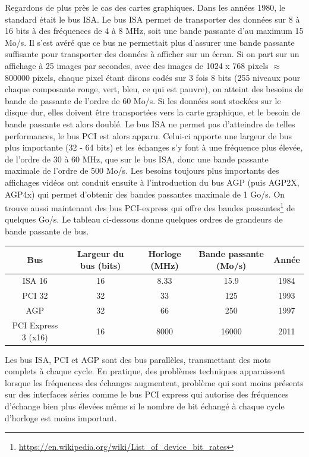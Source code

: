 Regardons de plus près le cas des cartes graphiques. Dans les années 1980, le standard était le bus ISA. Le bus ISA permet de transporter des données sur 8 à 16 bits à des fréquences de 4 à 8 MHz, soit une bande passante d'au maximum 15 Mo/s. Il s'est avéré que ce bus ne permettait plus d'assurer une bande passante suffisante pour transporter des données à afficher sur un écran. Si on part sur un affichage à 25 images par secondes, avec des images de 1024 x 768 pixels $\approx$ 800000 pixels, chaque pixel étant disons codés sur 3 fois 8 bits (255 niveaux pour chaque composante rouge, vert, bleu, ce qui est pauvre), on atteint des besoins de bande de passante de l'ordre de 60 Mo/s. Si les données sont stockées sur le disque dur, elles doivent être transportées vers la carte graphique, et le besoin de bande passante est alors doublé. Le bus ISA ne permet pas d'atteindre de telles performances, le bus PCI est alors apparu. Celui-ci apporte une largeur de bus plus importante (32 - 64 bits) et les échanges s'y font à une fréquence plus élevée, de l'ordre de 30 à 60 MHz, que sur le bus ISA, donc une bande passante maximale de l'ordre de 500 Mo/s. Les besoins toujours plus importants des affichages vidéos ont conduit ensuite à l'introduction du bus AGP (puis AGP2X, AGP4x) qui permet d'obtenir des bandes passantes maximale de 1 Go/s. On trouve aussi maintenant des bus PCI-express qui offre des bandes passantes\footnote{\url{https://en.wikipedia.org/wiki/List_of_device_bit_rates}} de quelques Go/s. Le tableau ci-dessous donne quelques ordres de grandeurs de bande passante de bus.

\begin{tabular}{ccccc}
Bus & Largeur du bus (bits)  & Horloge (MHz) & Bande passante (Mo/s)& Année\\
\hline
ISA 16 & 16  & 8.33 & 15.9 & 1984\\
PCI 32 & 32  & 33 & 125& 1993\\
AGP & 32	&66	&250 & 1997\\
PCI Express 3 (x16) & 16 & 8000 & 16000 & 2011
\end{tabular}

Les bus ISA, PCI et AGP sont des bus parallèles, transmettant des mots complets à chaque cycle. En pratique, des problèmes techniques apparaissent lorsque les fréquences des échanges augmentent, problème qui sont moins présents sur des interfaces séries comme le bus PCI express qui autorise des fréquences d'échange bien plus élevées même si le nombre de bit échangé à chaque cycle d'horloge est moins important.
 
